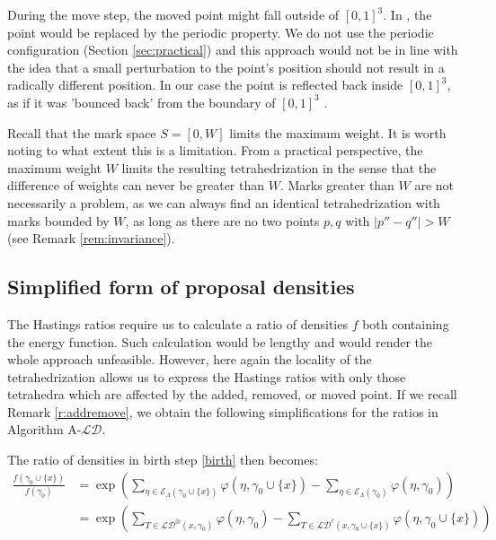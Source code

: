 

During the move step, the moved point might fall outside of $[0,1]^3$. In \cite{DereudreLavancier2011}, the point would be replaced by the periodic property. We do not use the periodic configuration (Section \ref{sec:practical}) and this approach would not be in line with the idea that a small perturbation to the point's position should not result in a radically different position. 
In our case the point is reflected back inside $[0,1]^3$, as if it was 'bounced back' from the boundary of $[0,1]^3$ .

\begin{remark}
Recall that the mark space $S=[0,W]$ limits the maximum weight. It is worth noting to what extent this is a limitation. From a practical perspective, the maximum weight $W$ limits the resulting tetrahedrization in the sense that the difference of weights can never be greater than $W$. Marks greater than $W$ are not necessarily a problem, as we can always find an identical tetrahedrization with marks bounded by $W$, as long as there are no two points $p,q$ with $|p''-q''|>W$ (see Remark \ref{rem:invariance}).
\end{remark}


\subsection{Simplified form of proposal densities}
The Hastings ratios require us to calculate a ratio of densities $f$ both containing the energy function. Such calculation would be lengthy and would render the whole approach unfeasible. However, here again the locality of the tetrahedrization allows us to express the Hastings ratios with only those tetrahedra which are affected by the added, removed, or moved point. If we recall Remark \ref{r:addremove}, we obtain the following simplifications for the ratios in Algorithm A-$\mathcal {LD}$.

The ratio of densities in birth step \eqref{birth} then becomes:
\begin{align*}
\frac{f(\gamma_0 \cup\{x\})}{f(\gamma_0)} &= \exp\left({\sum_{\eta\in \mathcal E_\Lambda(\gamma_0 \cup\{x\})} \varphi(\eta,\gamma_0 \cup\{x\}) - \sum_{\eta\in \mathcal E_\Lambda(\gamma_0)}\varphi(\eta,\gamma_0)}\right) \\
&= \exp\left(  \sum_{T \in \mathcal {LD}^\otimes (x,\gamma_0)} \varphi(\eta,\gamma_0)  - \sum_{T\in \mathcal {LD}^\ell (x,\gamma_0 \cup\{x\})} \varphi(\eta,\gamma_0 \cup\{x\}) \right)  
\end{align*}


